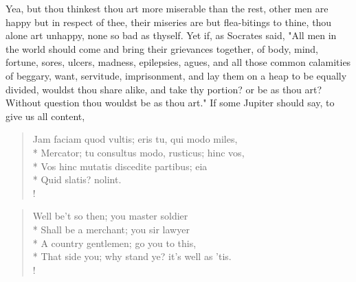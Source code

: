 {Yea, but thou thinkest thou art more miserable than the rest, other men are happy but in respect of thee, their miseries are but flea-bitings to thine, thou alone art unhappy, none so bad as thyself. Yet if, as Socrates said, "All men in the world should come and bring their grievances together, of body, mind, fortune, sores, ulcers, madness, epilepsies, agues, and all those common calamities of beggary, want, servitude, imprisonment, and lay them on a heap to be equally divided, wouldst thou share alike, and take thy portion? or be as thou art? Without question thou wouldst be as thou art." If some Jupiter should say, to give us all content,

\begin{latin}
\begin{verse}%
Jam faciam quod vultis; eris tu, qui modo miles,\\*
Mercator; tu consultus modo, rusticus; hinc vos,\\*
Vos hinc mutatis discedite partibus; eia\\*
Quid slatis? nolint.\\!
\end{verse}%
\end{latin}
\translationrule%
\begin{verse}%
Well be't so then; you master soldier\\*
Shall be a merchant; you sir lawyer\\*
A country gentlemen; go you to this,\\*
That side you; why stand ye? it's well as 'tis.\\!
\end{verse}%
%

}
